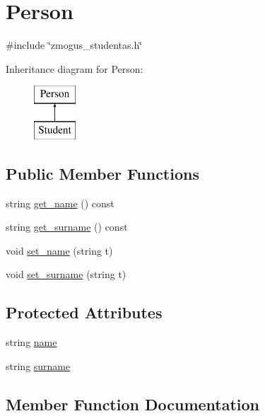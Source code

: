 \hypertarget{classPerson}{}\section{Person}
\label{classPerson}


{\ttfamily \#include \char`\"{}zmogus\+\_\+studentas.\+h\char`\"{}}

Inheritance diagram for Person\+:\begin{figure}[H]
\begin{center}
\leavevmode
\includegraphics[height=2.000000cm]{classPerson}
\end{center}
\end{figure}
\subsection*{Public Member Functions}
\begin{DoxyCompactItemize}
\item 
string \mbox{\hyperlink{classPerson_ad2784fa1040db0a5123721226039c2c8}{get\+\_\+name}} () const
\item 
string \mbox{\hyperlink{classPerson_a2dfd43e34424a3c6f40598a6dc0b5f28}{get\+\_\+surname}} () const
\item 
void \mbox{\hyperlink{classPerson_abe323fe4507bbf06e7677cc049d9fa86}{set\+\_\+name}} (string t)
\item 
void \mbox{\hyperlink{classPerson_a7856672997420904aa1650806c6b2063}{set\+\_\+surname}} (string t)
\end{DoxyCompactItemize}
\subsection*{Protected Attributes}
\begin{DoxyCompactItemize}
\item 
string \mbox{\hyperlink{classPerson_a8ccf841cb59e451791bcb2e1ac4f1edc}{name}}
\item 
string \mbox{\hyperlink{classPerson_acb03bac0d1d003c3c1a88da1524d2c3a}{surname}}
\end{DoxyCompactItemize}


\subsection{Member Function Documentation}
\mbox{\label{classPerson_ad2784fa1040db0a5123721226039c2c8}} 
